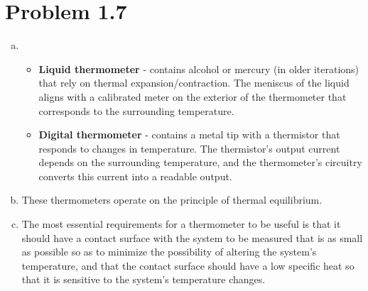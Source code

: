 \documentclass[12pt,a4paper]{article}
\begin{document}
\setcounter{page}{1}

\section*{Problem 1.7}
\begin{enumerate}[(a)]

\item
	\begin{itemize}

		\item \textbf{Liquid thermometer} - contains alcohol or mercury (in older iterations) that rely on thermal expansion/contraction. The meniscus of the liquid aligns with a calibrated meter on the exterior of the thermometer that corresponds to the surrounding temperature.

		\item \textbf{Digital thermometer} - contains a metal tip with a thermistor that responds to changes in temperature. The thermistor's output current depends on the surrounding temperature, and the thermometer's circuitry converts this current into a readable output.

	\end{itemize}

\item These thermometers operate on the principle of thermal equilibrium.

\item The most essential requirements for a thermometer to be useful is that it should have a contact surface with the system to be measured that is as small as possible so as to minimize the possibility of altering the system's temperature, and that the contact surface should have a low specific heat so that it is sensitive to the system's temperature changes.

\end{enumerate}
\end{document}

